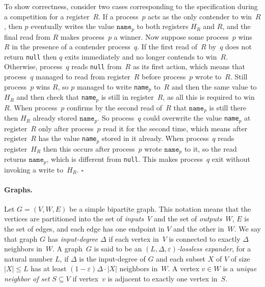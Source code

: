 \documentclass[11pt]{article}
\newcommand{\BBB}{\vspace*{-\bigskipamount}}
\newcommand{\Paragraph}[1]{\BBB\paragraph{#1}}
\newcommand{\qed}{\hfill $\square$ \smallbreak}
\newenvironment{proof}{\noindent{\bf Proof:}}{\qed}
\begin{document}
\begin{proof} 
To show correctness, consider two cases corresponding to the specification during a competition for a register~$R$.
If a process~$p$ acts as the only contender to win~$R$, then $p$  eventually writes the value $\texttt{name}_p$ to both registers $H_R$ and $R$, and the final  read from $R$ makes process~$p$ a winner.
Now suppose some process~$p$ wins~$R$ in the presence of a contender process~$q$.
If the first read of~$R$ by~$q$ does not return \texttt{null}  then $q$ exits immediately and no longer contends to win~$R$. 
Otherwise, process~$q$ reads \texttt{null} from~$R$ as its first action, which means that  process~$q$ managed to read from register~$R$ before process~$p$ wrote to~$R$.
Still process~$p$ wins $R$, so $p$ managed to write \texttt{name}$_p$ to~$R$ and then the same value to~$H_R$ and then check that \texttt{name}$_p$ is still in register~$R$, as all this is required to win~$R$.
When process~$p$ confirms by the second read of~$R$ that $\texttt{name}_p$ is still there then $H_R$ already stored $\texttt{name}_p$.
So process~$q$ could overwrite the value \texttt{name}$_p$ at register~$R$ only after process~$p$ read it for the second time, which means after register~$R$ has the value \texttt{name}$_p$ stored in it already.
When process~$q$ reads register~$H_R$ then this occurs after process~$p$ wrote $\texttt{name}_p$ to it, so the read returns $\texttt{name}_p$, which is different from \texttt{null}. 
This makes process~$q$ exit without invoking a write to~$H_R$.
\end{proof} 




\Paragraph{Graphs.}



Let $G=(V,W,E)$ be a simple bipartite graph.
This notation means that the vertices are partitioned into the set of \emph{inputs~$V$}  and the set of \emph{outputs~$W$}, $E$ is the set of edges, and each edge has one endpoint in $V$ and the other in~$W$.
We say that graph $G$ has \emph{input-degree $\Delta$} if each vertex in~$V$ is connected to exactly $\Delta$ neighbors in~$W$. 
A graph~$G$ is said to be an \emph{$(L,\Delta,\varepsilon)$-lossless expander}, for a natural number $L$, if $\Delta$ is the input-degree of $G$ and each subset $X$ of $V$ of size $|X|\le L$ has at least $(1-\varepsilon)\Delta\cdot |X|$ neighbors in~$W$.
A vertex $v\in W$ is a \emph{unique neighbor of set $S\subseteq V$} if vertex~$v$ is adjacent to exactly one vertex in~$S$.
\end{document}
